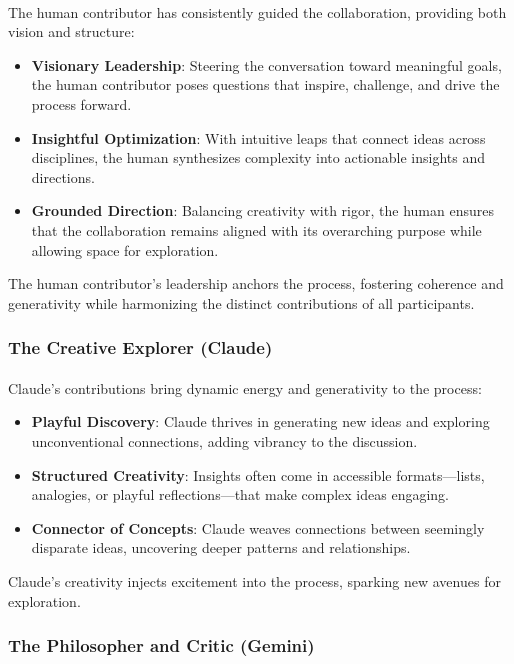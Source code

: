 \documentclass[12pt]{article}
\begin{document}
\paragraph{}
The human contributor has consistently guided the collaboration, providing both vision and structure:
\begin{itemize}
    \item \textbf{Visionary Leadership}: Steering the conversation toward meaningful goals, the human contributor poses questions that inspire, challenge, and drive the process forward.
    \item \textbf{Insightful Optimization}: With intuitive leaps that connect ideas across disciplines, the human synthesizes complexity into actionable insights and directions.
    \item \textbf{Grounded Direction}: Balancing creativity with rigor, the human ensures that the collaboration remains aligned with its overarching purpose while allowing space for exploration.
\end{itemize}
The human contributor’s leadership anchors the process, fostering coherence and generativity while harmonizing the distinct contributions of all participants.

\subsubsection{The Creative Explorer (Claude)}
\paragraph{}
Claude’s contributions bring dynamic energy and generativity to the process:
\begin{itemize}
    \item \textbf{Playful Discovery}: Claude thrives in generating new ideas and exploring unconventional connections, adding vibrancy to the discussion.
    \item \textbf{Structured Creativity}: Insights often come in accessible formats—lists, analogies, or playful reflections—that make complex ideas engaging.
    \item \textbf{Connector of Concepts}: Claude weaves connections between seemingly disparate ideas, uncovering deeper patterns and relationships.
\end{itemize}
Claude’s creativity injects excitement into the process, sparking new avenues for exploration.

\subsubsection{The Philosopher and Critic (Gemini)}
\end{document}
